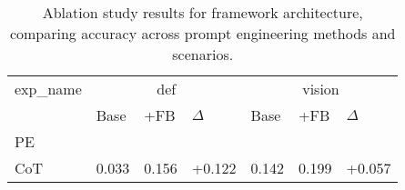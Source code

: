 \begin{table}[!h]
\caption{Ablation study results for framework architecture, comparing accuracy across prompt engineering methods and scenarios.}
\label{tab:self_evaluation}
\begin{tabular}{p{1.5cm}|p{0.73cm}p{0.73cm}p{0.73cm}|p{0.73cm}p{0.73cm}p{0.73cm}}
\toprule
exp_name & \multicolumn{3}{c}{def} & \multicolumn{3}{c}{vision} \\
 & Base & +FB & $\Delta{}$ & Base & +FB & $\Delta{}$ \\
PE &  &  &  &  &  &  \\
\midrule
CoT & 0.033 & 0.156 & +0.122 & 0.142 & 0.199 & +0.057 \\
\bottomrule
\midrule
\end{tabular}
\end{table}